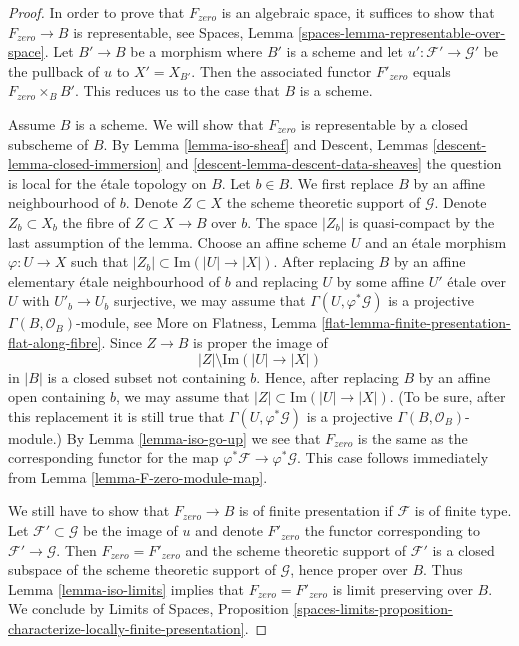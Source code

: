 \begin{proof}
In order to prove that $F_{zero}$ is an algebraic space, it suffices
to show that $F_{zero} \to B$ is representable, see
Spaces, Lemma \ref{spaces-lemma-representable-over-space}.
Let $B' \to B$ be a morphism where $B'$ is a scheme and let
$u' : \mathcal{F}' \to \mathcal{G}'$ be the pullback of $u$ to $X' = X_{B'}$.
Then the associated functor $F'_{zero}$ equals $F_{zero} \times_B B'$.
This reduces us to the case that $B$ is a scheme.

\medskip\noindent
Assume $B$ is a scheme. We will show that $F_{zero}$ is representable
by a closed subscheme of $B$. By Lemma \ref{lemma-iso-sheaf} and
Descent, Lemmas \ref{descent-lemma-closed-immersion} and
\ref{descent-lemma-descent-data-sheaves}
the question is local for the \'etale topology on $B$. Let $b \in B$.
We first replace $B$ by an affine neighbourhood of $b$.
Denote $Z \subset X$ the scheme theoretic support of $\mathcal{G}$.
Denote $Z_b \subset X_b$ the fibre of $Z \subset X \to B$ over $b$.
The space $|Z_b|$ is quasi-compact by the last assumption of the lemma.
Choose an affine scheme $U$ and an \'etale morphism $\varphi : U \to X$
such that $|Z_b| \subset \text{Im}(|U| \to |X|)$. After replacing $B$ by an
affine elementary \'etale neighbourhood of $b$ and replacing $U$
by some affine $U'$ \'etale over $U$ with $U'_b \to U_b$ surjective,
we may assume that $\Gamma(U, \varphi^*\mathcal{G})$ is a projective
$\Gamma(B, \mathcal{O}_B)$-module, see
More on Flatness, Lemma \ref{flat-lemma-finite-presentation-flat-along-fibre}.
Since $Z \to B$ is proper the image of
$$
|Z| \setminus \text{Im}(|U| \to |X|)
$$
in $|B|$ is a closed subset not containing $b$. Hence, after replacing
$B$ by an affine open containing $b$, we may assume that
$|Z| \subset \text{Im}(|U| \to |X|)$. (To be sure, after this replacement
it is still true that $\Gamma(U, \varphi^*\mathcal{G})$ is a projective
$\Gamma(B, \mathcal{O}_B)$-module.) By Lemma \ref{lemma-iso-go-up}
we see that $F_{zero}$ is the same as the corresponding functor
for the map $\varphi^*\mathcal{F} \to \varphi^*\mathcal{G}$.
This case follows immediately from Lemma \ref{lemma-F-zero-module-map}.

\medskip\noindent
We still have to show that $F_{zero} \to B$ is of finite presentation if
$\mathcal{F}$ is of finite type. Let $\mathcal{F}' \subset \mathcal{G}$
be the image of $u$ and denote $F'_{zero}$ the functor corresponding
to $\mathcal{F}' \to \mathcal{G}$. Then $F_{zero} = F'_{zero}$ and
the scheme theoretic support of $\mathcal{F}'$ is a closed subspace of
the scheme theoretic support of $\mathcal{G}$, hence proper over $B$.
Thus Lemma \ref{lemma-iso-limits} implies that $F_{zero} = F'_{zero}$
is limit preserving over $B$. We conclude by Limits of Spaces, Proposition
\ref{spaces-limits-proposition-characterize-locally-finite-presentation}.
\end{proof}

